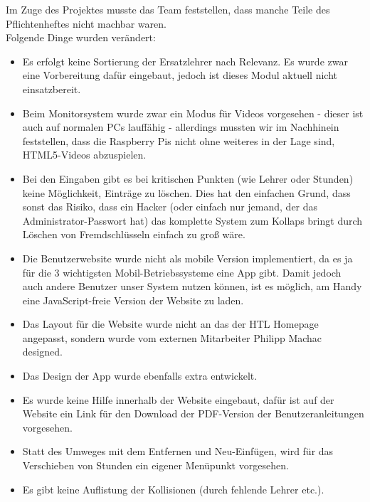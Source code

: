 Im Zuge des Projektes musste das Team feststellen, dass manche Teile des Pflichtenheftes nicht machbar waren.\\
Folgende Dinge wurden verändert:
\begin{itemize}
	\item Es erfolgt keine Sortierung der Ersatzlehrer nach Relevanz. Es wurde zwar eine Vorbereitung dafür eingebaut, jedoch ist dieses Modul aktuell nicht einsatzbereit.
	\item Beim Monitorsystem wurde zwar ein Modus für Videos vorgesehen - dieser ist auch auf normalen PCs lauffähig - allerdings mussten wir im Nachhinein feststellen, dass die Raspberry Pis nicht ohne weiteres in der Lage sind, HTML5-Videos abzuspielen.
	\item Bei den Eingaben gibt es bei kritischen Punkten (wie Lehrer oder Stunden) keine Möglichkeit, Einträge zu löschen. Dies hat den einfachen Grund, dass sonst das Risiko, dass ein Hacker (oder einfach nur jemand, der das Administrator-Passwort hat) das komplette System zum Kollaps bringt durch Löschen von Fremdschlüsseln einfach zu groß wäre.
	\item Die Benutzerwebsite wurde nicht als mobile Version implementiert, da es ja für die 3 wichtigsten Mobil-Betriebssysteme eine App gibt. Damit jedoch auch andere Benutzer unser System nutzen können, ist es möglich, am Handy eine JavaScript-freie Version der Website zu laden.
	\item Das Layout für die Website wurde nicht an das der HTL Homepage angepasst, sondern wurde vom externen Mitarbeiter Philipp Machac designed.
	\item Das Design der App wurde ebenfalls extra entwickelt.
	\item Es wurde keine Hilfe innerhalb der Website eingebaut, dafür ist auf der Website ein Link für den Download der PDF-Version der Benutzeranleitungen vorgesehen.
	\item Statt des Umweges mit dem Entfernen und Neu-Einfügen, wird für das Verschieben von Stunden ein eigener Menüpunkt vorgesehen.
	\item Es gibt keine Auflistung der Kollisionen (durch fehlende Lehrer etc.).
\end{itemize}
